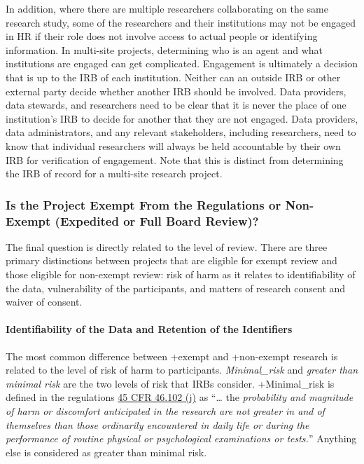 \documentclass[
]{WileySix}
\begin{document}
In addition, where there are multiple researchers collaborating on the same research study, some of the researchers and their institutions may not be engaged in HR if their role does not involve access to actual people or identifying information. In multi-site projects, determining who is an agent and what institutions are engaged can get complicated. Engagement is ultimately a decision that is up to the IRB of each institution. Neither can an outside IRB or other external party decide whether another IRB should be involved. Data providers, data stewards, and researchers need to be clear that it is never the place of one institution's IRB to decide for another that they are not engaged. Data providers, data administrators, and any relevant stakeholders, including researchers, need to know that individual researchers will always be held accountable by their own IRB for verification of engagement. Note that this is distinct from determining the IRB of record for a multi-site research project.

\hypertarget{is-the-project-exempt-from-the-regulations-or-non-exempt-expedited-or-full-board-review}{%
\subsubsection{Is the Project Exempt From the Regulations or Non-Exempt (Expedited or Full Board Review)?}\label{is-the-project-exempt-from-the-regulations-or-non-exempt-expedited-or-full-board-review}}

The final question is directly related to the level of review. There are three primary distinctions between projects that are eligible for exempt review and those eligible for non-exempt review: risk of harm as it relates to identifiability of the data, vulnerability of the participants, and matters of research consent and waiver of consent.

\hypertarget{identifiability-of-the-data-and-retention-of-the-identifiers}{%
\paragraph{Identifiability of the Data and Retention of the Identifiers}\label{identifiability-of-the-data-and-retention-of-the-identifiers}}

The most common difference between +exempt\textbar{} and +non-exempt\textbar{} research is related to the level of risk of harm to participants. \emph{Minimal\_risk} and \emph{greater than minimal risk} are the two levels of risk that IRBs consider. +Minimal\_risk\textbar{} is defined in the regulations \href{https://www.law.cornell.edu/cfr/text/45/46.102}{45 CFR 46.102 (j)} as ``\ldots{} the \emph{probability and magnitude of harm or discomfort anticipated in the research are not greater in and of themselves than those ordinarily encountered in daily life or during the performance of routine physical or psychological examinations or tests.}'' Anything else is considered as greater than minimal risk.
\end{document}
